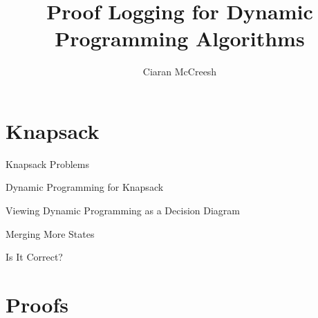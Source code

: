 \documentclass[aspectratio=169,compress,10pt]{beamer}
\author{Ciaran McCreesh}
\title{Proof Logging for Dynamic Programming Algorithms}
\begin{document}
{
    \begin{frame}
        \titlepage
    \end{frame}
}

\section{Knapsack}

\begin{frame}{Knapsack Problems}
\end{frame}

\begin{frame}{Dynamic Programming for Knapsack}
\end{frame}

\begin{frame}{Viewing Dynamic Programming as a Decision Diagram}
\end{frame}

\begin{frame}{Merging More States}
\end{frame}

\begin{frame}{Is It Correct?}
\end{frame}

\section{Proofs}
\end{document}
